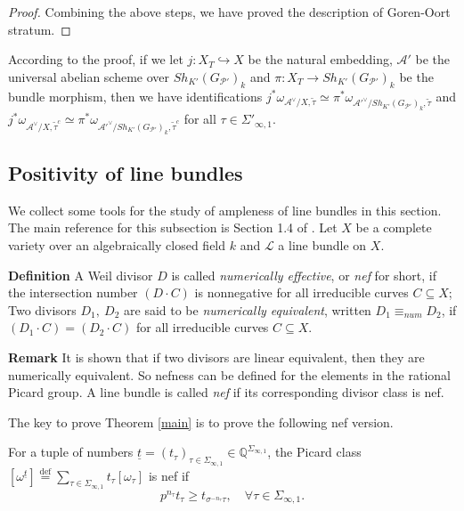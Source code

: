 \documentclass{article}
\begin{document}
\begin{proof}
Combining the above steps, we have proved the description of Goren-Oort stratum.

\end{proof}

\begin{remark}\label{identifications}
According to the proof, if we let $j:X_T\hookrightarrow X$ be the natural embedding, $\mathcal{A}'$ be the universal abelian scheme over $Sh_{K'}(G_{\mathcal{P}'})_k$ and $\pi:X_T\rightarrow Sh_{K'}(G_{\mathcal{P}'})_k$ be the bundle morphism, then we have identifications $j^\ast\omega_{\mathcal{A}^\vee/X,\tilde\tau}\simeq \pi^\ast\omega_{\mathcal{A}'^\vee/Sh_{K'}(G_{\mathcal{P}'})_k,\tilde\tau}$ and $j^\ast\omega_{\mathcal{A}^\vee/X,\tilde\tau^c}\simeq \pi^\ast\omega_{\mathcal{A}'^\vee/Sh_{K'}(G_{\mathcal{P}'})_k,\tilde\tau^c}$ for all $\tau\in\Sigma'_{\infty,1}$.
\end{remark} 





\subsection{Positivity of line bundles}

We collect some tools for the study of ampleness of line bundles in this section. The main reference for this subsection is Section 1.4 of \citep{Lazarsfeld}. Let $X$ be a complete variety over an algebraically closed field $k$ and $\mathcal{L}$ a line bundle on $X$. 

\medskip
\noindent\textbf{Definition}
	A Weil divisor $D$ is called \emph{numerically effective}, or \emph{nef} for short, if the intersection number $(D\cdot C)$ is nonnegative for all irreducible curves $C\subseteq X$; Two divisors $D_1,\ D_2$ are said to be \emph{numerically equivalent}, written $D_1\equiv_{num} D_2$, if $(D_1\cdot C)=(D_2\cdot C)$ for all irreducible curves $C\subseteq X$. 

\medskip
\noindent\textbf{Remark}
It is shown that if two divisors are linear equivalent, then they are numerically equivalent. So nefness can be defined for the elements in the rational Picard group. A line bundle is called \emph{nef} if its corresponding divisor class is nef.


The key to prove Theorem \ref{main} is to prove the following nef version.
\begin{theorem}\label{variant}
	For a tuple of numbers $\underline{t}=(t_\tau)_{\tau\in\Sigma_{\infty,1}}\in \mathbb{Q}^{\Sigma_{\infty,1}}$, the Picard class $[\omega^{\underline{t}}]\stackrel{\text{def}}{=}\sum\limits_{\tau\in\Sigma_{\infty,1}}t_\tau[\omega_\tau]$ is nef if
	\begin{equation}\label{inequality'}
		p^{n_\tau}t_\tau\ge t_{\sigma^{-n_\tau}\tau},\quad \forall\tau\in \Sigma_{\infty,1}.
	\end{equation}
\end{theorem}
\end{document}
